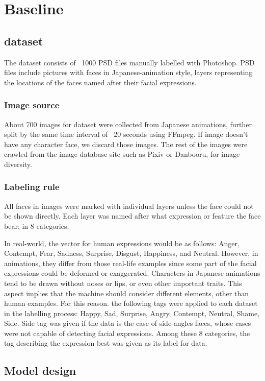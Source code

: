 \documentclass{article}
\begin{document}
\section{Baseline}
\subsection{dataset}
The dataset consists of ~1000 PSD files manually labelled with Photoshop. PSD
files include pictures with faces in Japanese-animation style, layers
representing the locations of the faces named after their facial expressions.

\subsubsection{Image source}
About 700 images for dataset were collected from Japanese animations, further
split by the same time interval of ~20 seconds using FFmpeg. If image doesn’t
have any character face, we discard those images. The rest of the images were
crawled from the image database site such as Pixiv or Danbooru, for image
diversity.

\subsubsection{Labeling rule}
All faces in images were marked with individual layers unless the face could not
be shown directly. Each layer was named after what expression or feature the
face bear; in 8 categories.

In real-world, the vector for human expressions would be as follows: Anger,
Contempt, Fear, Sadness, Surprise, Disgust, Happiness, and Neutral. However, in
animations, they differ from those real-life examples since some part of the
facial expressions could be deformed or exaggerated. Characters in Japanese
animations tend to be drawn without noses or lips, or even other important
traits. This aspect implies that the machine should consider different elements,
other than human examples. For this reason. the following tags were applied to
each dataset in the labelling process: Happy, Sad, Surprise, Angry, Contempt,
Neutral, Shame, Side. Side tag was given if the data is the case of side-angles
faces, whose cases were not capable of detecting facial expressions. Among these
8 categories, the tag describing the expression best was given as its label for
data.

\subsection{Model design}
\end{document}
